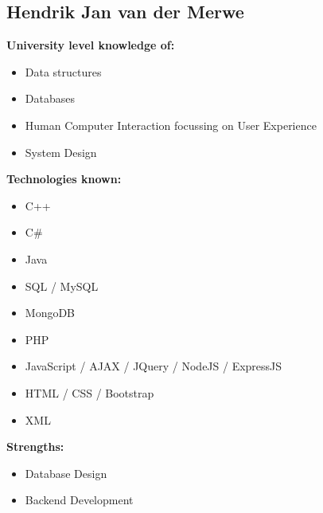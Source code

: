 \documentclass{article}
\begin{document}
\subsection {Hendrik Jan van der Merwe} 
\textbf{University level knowledge of:}
\begin{itemize}
 	\item Data structures
 	\item Databases
 	\item Human Computer Interaction focussing on User Experience
 	\item System Design
\end{itemize}
\textbf{Technologies known:}
\begin{itemize}
	\item C++
	\item C\#
	\item Java
	\item SQL / MySQL
	\item MongoDB
	\item PHP
	\item JavaScript / AJAX / JQuery / NodeJS / ExpressJS
	\item HTML / CSS / Bootstrap
	\item XML
\end{itemize}
\textbf{Strengths:}
\begin{itemize}
	\item Database Design
	\item Backend Development
\end{itemize}

\newpage
\end{document}
